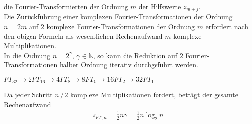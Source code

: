 die Fourier-Transformierten der Ordnung $m$ der Hilfswerte $z_{m+j}$. \\
Die Zurückführung einer komplexen Fourier-Transformationen der Ordnung $n=2m$ auf $2$ komplexe Fourier-Transformationen 
der Ordnung $m$ erfordert nach den obigen Formeln als wesentlichen Rechenaufwand $m$ komplexe Multiplikationen. \\
In die Ordnung $n=2^\gamma$, $\gamma\in\mathbb{N}$, so kann die Reduktion auf $2$ Fourier-Transformationen halber Ordnung
iterativ durchgeführt werden. \\
\begin{egbox}
  $FT_{32} \to 2FT_{16}\to 4FT_8 \to 8FT_4 \to 16FT_2\to 32FT_1$
\end{egbox}
Da jeder Schritt $n\,/\,2$ komplexe Multiplikationen fordert, beträgt der gesamte Rechenaufwand
\begin{align*}
  z_{FT,n} = \tfrac{1}{2}n\gamma = \tfrac{1}{2}n\log_2 n
\end{align*}

